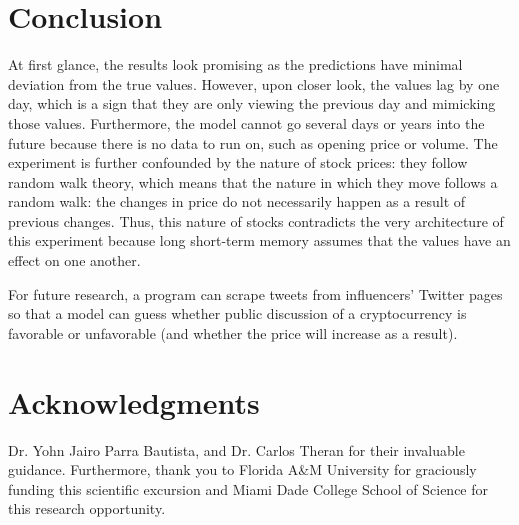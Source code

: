 \documentclass[acmtog,authorversion]{acmart}
\newcommand{\TODO}[2]{\todo[inline]{#1: #2}}
\begin{document}
\section{Conclusion}

At first glance, the results look promising as the predictions have minimal deviation from the true values. However, upon closer look, the values lag by one day, which is a sign that they are only viewing the previous day and mimicking those values. Furthermore, the model cannot go several days or years into the future because there is no data to run on, such as opening price or volume. The experiment is further confounded by the nature of stock prices: they follow random walk theory, which means that the nature in which they move follows a random walk: the changes in price do not necessarily happen as a result of previous changes. Thus, this nature of stocks contradicts the very architecture of this experiment because long short-term memory assumes that the values have an effect on one another.

For future research, a program can scrape tweets from influencers' Twitter pages so that a model can guess whether public discussion of a cryptocurrency is favorable or unfavorable (and whether the price will increase as a result).

\section*{Acknowledgments}

\TODO{JP}{no authors in ackn}
Dr. Yohn Jairo Parra Bautista, and Dr. Carlos Theran for their invaluable guidance. Furthermore, thank you to Florida A&M University for graciously funding this scientific excursion and Miami Dade College School of Science for this research opportunity.


 
\end{document}
